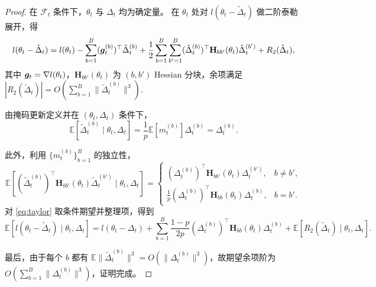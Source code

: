 \documentclass[11pt, a4paper, twocolumn, copyright, goog]{google}
\theoremstyle{plain}
\theoremstyle{definition}
\theoremstyle{remark}
\begin{document}
\begin{proof}
在 $\mathcal F_t$ 条件下，$\theta_t$ 与 $\Delta_t$ 均为确定量。
在 $\theta_t$ 处对 $l(\theta_t-\tilde{\Delta}_t)$ 做二阶泰勒展开，得
\begin{equation} \label{eq:taylor}
    l(\theta_t-\tilde{\Delta}_t) = l(\theta_t) - \sum_{b=1}^B ({\bm{g}}_t^{(b)})^\top \tilde{\Delta}_t^{(b)} + \frac{1}{2} \sum_{b=1}^B\sum_{b'=1}^B (\tilde{\Delta}_t^{(b)})^\top \mathbf{H}_{bb'}(\theta_t) \tilde{\Delta}_t^{(b')} + R_2(\tilde{\Delta}_t),
\end{equation}
其中 ${\bm{g}}_t=\nabla l(\theta_t)$，$\mathbf{H}_{bb'}(\theta_t)$ 为 $(b,b')$ Hessian 分块，余项满足 $|R_2(\tilde{\Delta}_t)| = O \left(\sum_{b=1}^B \|\tilde{\Delta}_t^{(b)}\|^3\right).$

由掩码更新定义并在 $(\theta_t,\Delta_t)$ 条件下，
\begin{equation}
    \mathbb{E}[\tilde{\Delta}_t^{(b)} \mid \theta_t,\Delta_t] = \frac{1}{p}\mathbb{E}[m_{t}^{(b)}]\Delta_t^{(b)} = \Delta_t^{(b)}.
\end{equation}

此外，利用 $\{m_{t}^{(b)}\}_{b=1}^B$ 的独立性，
\begin{equation}
    \mathbb{E} \left[ (\tilde{\Delta}_t^{(b)})^\top \mathbf{H}_{bb'}(\theta_t) \tilde{\Delta}_t^{(b')} \mid \theta_t,\Delta_t \right] =
        \begin{cases}
        (\Delta_t^{(b)})^\top \mathbf{H}_{bb'}(\theta_t)\Delta_t^{(b')},          & b\neq b',\\[6pt]
        \frac{1}{p} (\Delta_t^{(b)})^\top \mathbf{H}_{bb}(\theta_t)\Delta_t^{(b)},
        & b=b'.
        \end{cases}
\end{equation}
对 \eqref{eq:taylor} 取条件期望并整理项，得到
\begin{equation}
    \mathbb{E}[l(\theta_t-\tilde{\Delta}_t)\mid \theta_t,\Delta_t] = l(\theta_t-\Delta_t) + \sum_{b=1}^B \frac{1-p}{2p} (\Delta_t^{(b)})^\top \mathbf{H}_{bb}(\theta_t) \Delta_t^{(b)}  + \mathbb{E}[R_2(\tilde{\Delta}_t)\mid \theta_t,\Delta_t].
\end{equation}

最后，由于每个 $b$ 都有 $\mathbb{E}\|\tilde{\Delta}_t^{(b)}\|^3 = O(\|\Delta_t^{(b)}\|^3)$，故期望余项阶为 $O \left(\sum_{b=1}^B \|\Delta_t^{(b)}\|^3\right)$，证明完成。
\end{proof}
\end{document}
